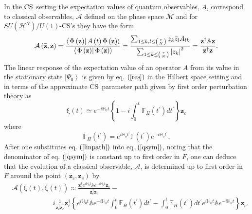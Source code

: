 \documentclass[aps,preprint]{revtex4}%
\begin{document}
In the CS\ setting the expectation values of quantum observables, $A$,
correspond to classical observables, $\mathcal{A}$ defined on the phase space
$\mathcal{M}$ and for $SU\left(  \mathcal{H}^{N}\right)  /U\left(  1\right)
$-CS's they have the form
\begin{equation}
\mathcal{A}\left(  \mathbf{\bar{z}},\mathbf{z}\right)  =\frac{\left\langle
\left.  \Phi\left(  \mathbf{z}\right)  \right\vert A\left(  t\right)
\Phi\left(  \mathbf{z}\right)  \right\rangle }{\left\langle \left.
\Phi\left(  \mathbf{z}\right)  \right\vert \Phi\left(  \mathbf{z}\right)
\right\rangle }=\frac{\sum_{1\leq k,l\leq\left(
\genfrac{}{}{0pt}{}{r}{N}%
\right)  }z_{k}\bar{z}_{l}A_{lk}}{\sum_{1\leq k\leq\left(
\genfrac{}{}{0pt}{}{r}{N}%
\right)  }\left\vert z_{k}\right\vert ^{2}}=\frac{\mathbf{z}^{\dagger
}\mathbb{A}\mathbf{z}}{\mathbf{z}^{\dagger}\mathbf{z}}.
\end{equation}
The linear response of the expectation value of an operator $A$ from its value
in the stationary state $\left\vert \Psi_{0}\right\rangle $ is given by eq.
$\left(  \ref{res}\right)  $ in the Hilbert space setting and in terms of the
approximate CS\ parameter path given by first order perturbation theory as
\begin{equation}
\mathrm{\xi}\left(  t\right)  \simeq e^{-i\mathbb{H}_{0}t}\left\{  1-i\int
_{0}^{t}\mathbb{F}_{H}\left(  t^{\prime}\right)  dt^{\prime}\right\}
\mathbf{z}_{c}%
\end{equation}
where
\begin{equation}
\mathbb{F}_{H}\left(  t^{\prime}\right)  =e^{i\mathbb{H}_{o}t^{\prime}%
}\mathbb{F}\left(  t^{\prime}\right)  e^{-i\mathbb{H}_{o}t^{\prime}}.
\end{equation}
After one substitutes eq. $\left(  \ref{linpath}\right)  $ into eq. $\left(
\ref{qsym}\right)  $, noting that the denominator of eq. $\left(
\ref{qsym}\right)  $ is constant up to first order in $F$, one can deduce that
the evolution of a classical observable, $\mathcal{A}$, is determined up to
first order in $F$ around the point $\left(  \mathbf{\bar{z}}_{c}%
,\mathbf{z}_{c}\right)  $ by
\begin{align}
&  \mathcal{A}\left(  \mathrm{\bar{\xi}}\left(  t\right)  ,\mathrm{\xi}\left(
t\right)  \right)  \approx\frac{\mathbf{z}_{c}^{\dagger}e^{i\mathbb{H}_{0}%
t}\mathbb{A}e^{-i\mathbb{H}_{0}t}\mathbf{z}_{c}}{\mathbf{z}_{c}^{\dagger
}\mathbf{z}_{c}}-\nonumber\\
&  \qquad\qquad\qquad i\frac{1}{\mathbf{z}_{c}^{\dagger}\mathbf{z}_{c}%
}\mathbf{z}_{c}^{\dagger}\left\{  e^{i\mathbb{H}_{0}t}\mathbb{A}%
e^{-i\mathbb{H}_{0}t}\int_{0}^{t}\mathbb{F}_{H}\left(  t^{\prime}\right)
dt^{\prime}-\int_{0}^{t}\mathbb{F}_{H}\left(  t^{\prime}\right)  dt^{\prime
}e^{i\mathbb{H}_{0}t}\mathbb{A}e^{-i\mathbb{H}_{0}t}\right\}  \mathbf{z}_{c}.
\end{align}
\end{document}
